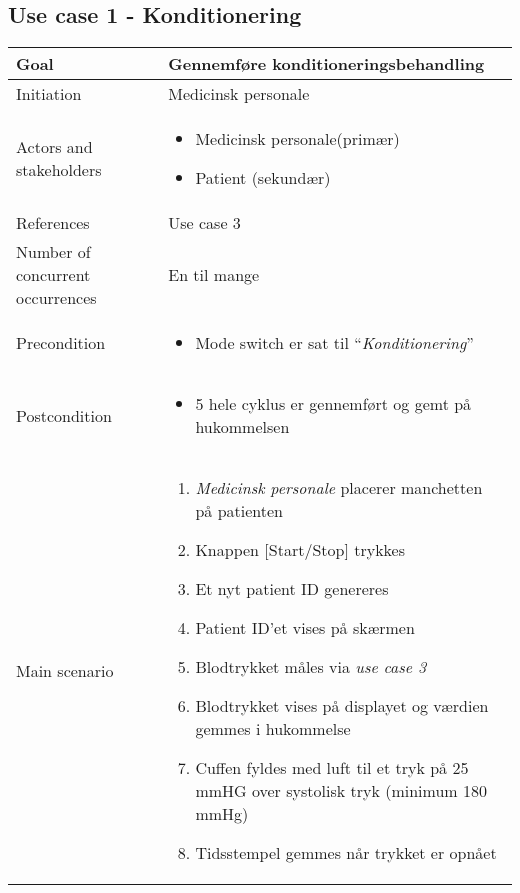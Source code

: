 \subsection{Use case 1 - Konditionering}
\begin{center}
		\begin{tabular}{ | m{4cm} | m{8cm}| } 
			\hline
			Goal& Gennemføre konditioneringsbehandling  \\ 
			\hline
			Initiation &  Medicinsk personale\\
			\hline
			Actors and stakeholders & 
			\begin{itemize}
				\item Medicinsk personale(primær)
				\item Patient (sekundær)
			\end{itemize} \\ 
			\hline
			References & Use case 3 \\ 
			\hline
			Number of concurrent occurrences & En til mange\\ 
			\hline	
			Precondition & 
			\begin{itemize}
				\item Mode switch er sat til “\textit{Konditionering}”
			\end{itemize} \\ 
			\hline
			Postcondition & 
			\begin{itemize}
				\item 5 hele cyklus er gennemført og gemt på hukommelsen
			\end{itemize} \\ 
			\hline
			Main scenario & \begin{enumerate}
				\setlength\itemsep{0cm} %
				\item \textit{Medicinsk personale} placerer manchetten på patienten
				\item Knappen [Start/Stop] trykkes
				\item Et nyt patient ID genereres
				\subitem[Extension \#1] 
				\item Patient ID’et vises på skærmen
				\item Blodtrykket måles via \textit{use case 3}
				\subitem[Extension \#2]
				\item Blodtrykket vises på displayet og værdien gemmes i hukommelse
				\item Cuffen fyldes med luft til et tryk på 25 mmHG over systolisk tryk (minimum 180 mmHg)
				\item Tidsstempel gemmes når trykket er opnået

\end{enumerate}
\end{tabular}
\end{center}

